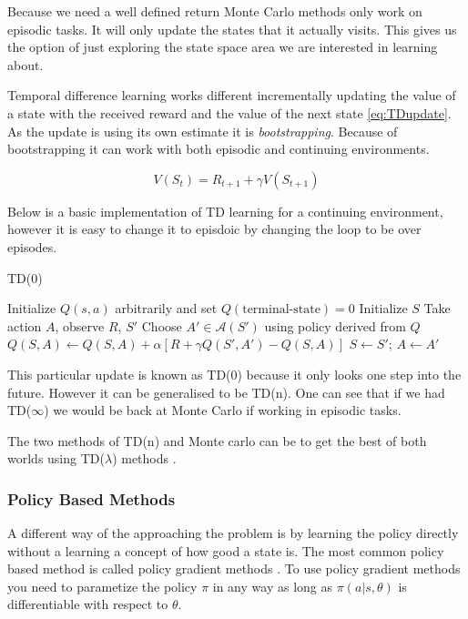 Because we need a well defined return Monte Carlo methods only work on episodic tasks. It will only update the states that it actually visits. This gives us the option of just exploring the state space area we are interested in learning about.

Temporal difference learning works different incrementally updating the value of a state with the received reward and the value of the next state \ref{eq:TDupdate}. As the update is using its own estimate it is \textit{bootstrapping}. Because of bootstrapping it can work with both episodic and continuing environments.

\begin{equation}
V(S_{t})=R_{t+1}+\gamma V(S_{t+1})
\label{eq:TDupdate}
\end{equation}

Below is a basic implementation of TD learning for a continuing environment, however it is easy to change it to episdoic by changing the loop to be over episodes.

\begin{algorithm}
\caption{TD(0)}
\begin{algorithmic}[1]
\State Initialize $Q(s,a)$ arbitrarily and set $Q(\text{terminal-state}) = 0$
\State Initialize $S$
    \State Take action $A$, observe $R$, $S'$
    \State Choose $A' \in \mathcal{A}(S')$ using policy derived from $Q$
    \State $Q(S,A) \gets Q(S,A) + \alpha \left[ R + \gamma Q(S', A') - Q(S,A) \right]$
    \State $S \gets S'$; $A \gets A'$
\EndWhile
\end{algorithmic}
\end{algorithm}

This particular update is known as TD(0) because it only looks one step into the future. However it can be generalised to be TD(n). One can see that if we had TD($\infty$) we would be back at Monte Carlo if working in episodic tasks.

The two methods of TD(n) and Monte carlo can be to get the best of both worlds using TD($\lambda$) methods \cite{suttonLearningPredictMethods1988}.


\subsubsection{Policy Based Methods}

A different way of the approaching the problem is by learning the policy directly without a learning a concept of how good a state is. The most common policy based method is called policy gradient methods \cite{suttonPolicyGradientMethods1999}. To use policy gradient methods you need to parametize the policy $\pi$ in any way as long as $\pi(a|s, \theta)$ is differentiable with respect to $\theta$.


